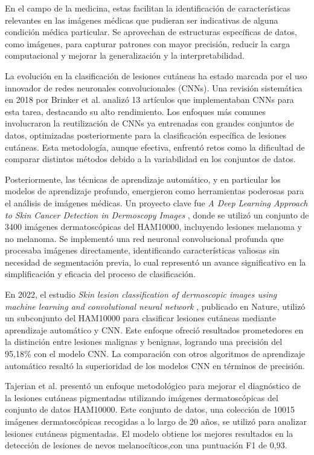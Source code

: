 En el campo de la medicina, estas facilitan la identificación de características relevantes en las imágenes médicas que pudieran ser indicativas de alguna condición médica particular. Se aprovechan de estructuras específicas de datos, como imágenes, para capturar patrones con mayor precisión, reducir la carga computacional y mejorar la generalización y la interpretabilidad. 

La evolución en la clasificación de lesiones cutáneas ha estado marcada por el uso innovador de redes neuronales convolucionales (CNNs). Una revisión sistemática en 2018 por Brinker et al.  analizó 13 artículos que implementaban CNNs para esta tarea, destacando su alto rendimiento. Los enfoques más comunes involucraron la reutilización de CNNs ya entrenadas con grandes conjuntos de datos, optimizadas posteriormente para la clasificación específica de lesiones cutáneas. Esta metodología, aunque efectiva, enfrentó retos como la dificultad de comparar distintos métodos debido a la variabilidad en los conjuntos de datos.

Posteriormente, las técnicas de aprendizaje automático, y en particular los modelos de aprendizaje profundo, emergieron como herramientas poderosas para el análisis de imágenes médicas. Un proyecto clave fue \textit{A Deep Learning Approach to Skin Cancer Detection in Dermoscopy Images} , donde se utilizó un conjunto de 3400 imágenes dermatoscópicas del HAM10000, incluyendo lesiones melanoma y no melanoma. Se implementó una red neuronal convolucional profunda que procesaba imágenes directamente, identificando características valiosas sin necesidad de segmentación previa, lo cual representó un avance significativo en la simplificación y eficacia del proceso de clasificación.

En 2022, el estudio \textit{Skin lesion classification of dermoscopic images using machine learning and convolutional neural network} , publicado en Nature, utilizó un subconjunto del HAM10000 para clasificar lesiones cutáneas mediante aprendizaje automático y CNN. Este enfoque ofreció resultados prometedores en la distinción entre lesiones malignas y benignas, logrando una precisión del 95,18\% con el modelo CNN. La comparación con otros algoritmos de aprendizaje automático resaltó la superioridad de los modelos CNN en términos de precisión.

Tajerian et al.  presentó un enfoque metodológico para mejorar el diagnóstico de la lesiones cutáneas pigmentadas utilizando imágenes dermatoscópicas del conjunto de datos HAM10000. Este conjunto de datos, una colección de 10015 imágenes dermatoscópicas recogidas a lo largo de 20 años, se utilizó para analizar lesiones cutáneas pigmentadas. El modelo obtiene los mejores resultados en la detección de lesiones de nevos melanocíticos,con una puntuación F1 de 0,93.

